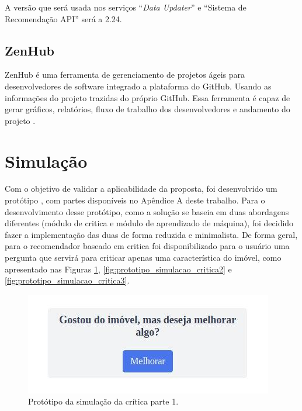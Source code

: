 A versão que será usada nos serviços “\textit{Data Updater}” e “Sistema de Recomendação API” será a 2.24.

\subsection{ZenHub}
\label{section_zenhub}

ZenHub é uma ferramenta de gerenciamento de projetos ágeis para desenvolvedores de software integrado a plataforma do GitHub. Usando as informações do projeto trazidas do próprio GitHub. Essa ferramenta é capaz de gerar gráficos, relatórios, fluxo de trabalho dos desenvolvedores e andamento do projeto \cite{zenhub:2019}.

\section{Simulação}

Com o objetivo de validar a aplicabilidade da proposta, foi desenvolvido um protótipo , com partes disponíveis no Apêndice A deste trabalho. Para o desenvolvimento desse protótipo, como a solução se baseia em duas abordagens diferentes (módulo de critica e módulo de aprendizado de máquina), foi decidido fazer a implementação das duas de forma reduzida e minimalista. De forma geral, para o recomendador baseado em critica foi disponibilizado para o usuário uma pergunta que servirá para criticar apenas uma característica do imóvel, como apresentado nas Figuras \ref{fig:prototipo_simulacao_critica1}, \ref{fig:prototipo_simulacao_critica2} e \ref{fig:prototipo_simulacao_critica3}.

\begin{figure}[H]
    \centering
    \includegraphics[scale=0.9]{figuras/consideracoes_finais/prototipo_simulacao_critica1.jpg}
    \caption[Protótipo da simulação da crítica parte 1]{Protótipo da simulação da crítica parte 1.}
    \label{fig:prototipo_simulacao_critica1}
\end{figure}

